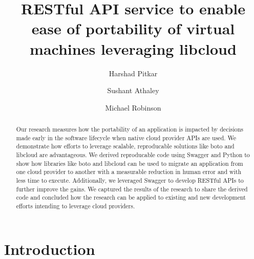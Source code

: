 % 
\title{RESTful API service to enable ease of portability of virtual
machines leveraging libcloud}


\author{Harshad Pitkar}

\author{Sushant Athaley}

\author{Michael Robinson}


\renewcommand{\shortauthors}{H. Pitkar, S. Athaley, M. Robinson}


\begin{abstract}
Our research measures how the portability of an application is impacted by decisions 
made early in the software lifecycle when native cloud provider APIs are used. We  
demonstrate how efforts to leverage scalable, reproducable solutions like boto and 
libcloud are advantageous. We derived reproducable code using Swagger and Python
to show how libraries like boto and libcloud can be used to migrate an application from 
one cloud provider to another with a measurable reduction in human error and with less 
time to execute. Additionally, we leveraged Swagger to develop RESTful APIs to 
further improve the gains. We captured the results of the research to share the derived 
code and concluded how the research can be applied to existing and new development efforts 
intending to leverage cloud providers. 
\end{abstract}



\maketitle

\section{Introduction}\label{introduction}

